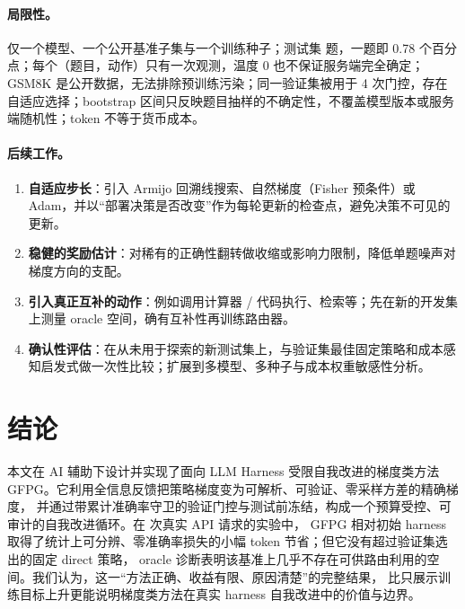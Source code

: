 \documentclass[a4paper,zihao=5,linespread=1.38]{ctexart}
\newcommand{\act}[1]{\textsf{#1}}
\begin{document}
\paragraph{局限性。}仅一个模型、一个公开基准子集与一个训练种子；测试集 \numTestN{} 题，一题即 0.78 个百分点；每个（题目，动作）只有一次观测，温度 0 也不保证服务端完全确定；
GSM8K 是公开数据，无法排除预训练污染；同一验证集被用于 4 次门控，存在自适应选择；bootstrap 区间只反映题目抽样的不确定性，不覆盖模型版本或服务端随机性；token 不等于货币成本。

\paragraph{后续工作。}
\begin{enumerate}[label=(\arabic*)]
  \item \textbf{自适应步长}：引入 Armijo 回溯线搜索、自然梯度（Fisher 预条件）或 Adam，并以“部署决策是否改变”作为每轮更新的检查点，避免决策不可见的更新。
  \item \textbf{稳健的奖励估计}：对稀有的正确性翻转做收缩或影响力限制，降低单题噪声对梯度方向的支配。
  \item \textbf{引入真正互补的动作}：例如调用计算器 / 代码执行、检索等；先在新的开发集上测量 oracle 空间，确有互补性再训练路由器。
  \item \textbf{确认性评估}：在从未用于探索的新测试集上，与验证集最佳固定策略和成本感知启发式做一次性比较；扩展到多模型、多种子与成本权重敏感性分析。
\end{enumerate}

\section{结论}\label{sec:conclusion}
本文在 AI 辅助下设计并实现了面向 LLM Harness 受限自我改进的梯度类方法 GFPG。它利用全信息反馈把策略梯度变为可解析、可验证、零采样方差的精确梯度，
并通过带累计准确率守卫的验证门控与测试前冻结，构成一个预算受控、可审计的自我改进循环。在 \numAttempts{} 次真实 API 请求的实验中，
GFPG 相对初始 harness 取得了统计上可分辨、零准确率损失的小幅 token 节省；但它没有超过验证集选出的固定 \act{direct} 策略，
oracle 诊断表明该基准上几乎不存在可供路由利用的空间。我们认为，这一“方法正确、收益有限、原因清楚”的完整结果，
比只展示训练目标上升更能说明梯度类方法在真实 harness 自我改进中的价值与边界。
\end{document}

